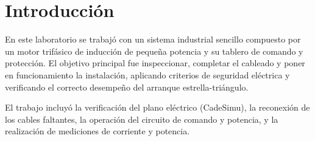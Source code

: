 \section{Introducción}
En este laboratorio se trabajó con un sistema industrial sencillo compuesto por un motor trifásico de inducción de pequeña potencia y su tablero de comando y protección. 
El objetivo principal fue inspeccionar, completar el cableado y poner en funcionamiento la instalación, aplicando criterios de seguridad eléctrica y verificando el correcto desempeño del arranque estrella-triángulo.  

El trabajo incluyó la verificación del plano eléctrico (CadeSimu), la reconexión de los cables faltantes, la operación del circuito de comando y potencia, y la realización de mediciones de corriente y potencia.
